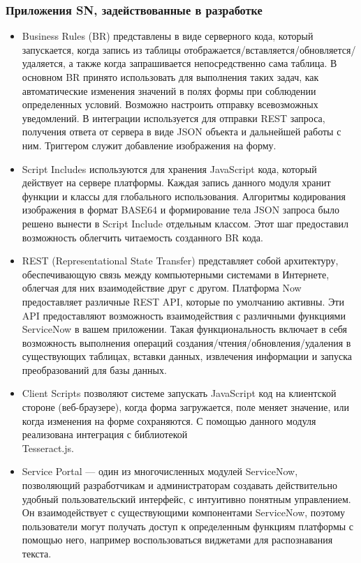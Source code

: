 \documentclass[14pt]{mmcs_article}
\begin{document}
\subsubsection{Приложения SN, задействованные в разработке} 
\begin{itemize}
\item Business Rules (BR) \cite{stud:b1} представлены в виде серверного кода, который запускается, когда запись из таблицы отображается/вставляется/обновляется/удаляется, а также когда запрашивается непосредственно сама таблица. В основном BR принято использовать для выполнения таких задач, как автоматические изменения значений в полях формы при соблюдении определенных условий. Возможно настроить отправку всевозможных уведомлений. В интеграции используется для отправки REST запроса, получения ответа от сервера в виде JSON объекта и дальнейшей работы с ним. Триггером служит добавление изображения на форму.
\item Script Includes \cite{stud:b2} используются для хранения JavaScript кода, который действует на сервере платформы. Каждая запись данного модуля хранит функции и классы для глобального использования. Алгоритмы кодирования изображения в формат BASE64 и формирование тела JSON запроса было решено вынести в Script Include отдельным классом. Этот шаг предоставил возможность облегчить читаемость созданного BR кода.
\item REST (Representational State Transfer) \cite{stud:b3} представляет собой архитектуру, обеспечивающую связь между компьютерными системами в Интернете, облегчая для них взаимодействие друг с другом. Платформа Now предоставляет различные REST API, которые по умолчанию активны. Эти API предоставляют возможность взаимодействия с различными функциями ServiceNow в вашем приложении. Такая функциональность включает в себя возможность выполнения операций создания/чтения/обновления/удаления в существующих таблицах, вставки данных, извлечения информации и запуска преобразований для базы данных.
\item Client Scripts \cite{stud:b4} позволяют системе запускать JavaScript код на клиентской стороне (веб-браузере), когда форма загружается, поле меняет значение, или когда изменения на форме сохраняются. С помощью данного модуля реализована интеграция с библиотекой \\ Tesseract.js.
\item Service Portal \cite{stud:b5} — один из многочисленных модулей ServiceNow, позволяющий разработчикам и администраторам создавать действительно удобный пользовательский интерфейс, с интуитивно понятным управлением. Он взаимодействует с существующими компонентами ServiceNow, поэтому пользователи могут получать доступ к определенным функциям платформы с помощью него, например воспользоваться виджетами для распознавания текста.

\end{itemize}
\end{document}
